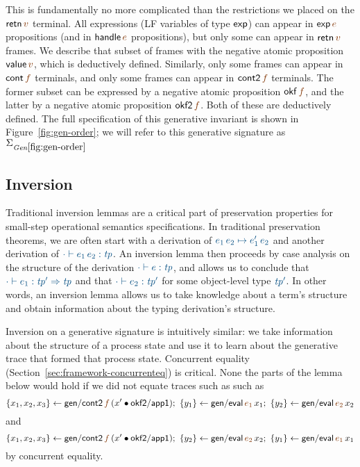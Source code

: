 This is fundamentally no more complicated than the restrictions we
placed on the ${\sf retn}\,\lf{v}$ terminal. All expressions (LF
variables of type ${\sf exp}$) can appear in ${\sf exp}\,\lf{e}$
propositions (and in ${\sf handle}\,\lf{e}$ propositions), but only
some can appear in ${\sf retn}\,\lf{v}$ frames. We describe that
subset of frames with the negative atomic proposition ${\sf
  value}\,\lf{v}$, which is deductively defined. Similarly, only some
frames can appear in ${\sf cont}\,\lf{f}$ terminals, and only some
frames can appear in ${\sf cont2}\,\lf{f}$ terminals. The former subset
can be expressed by a negative atomic proposition ${\sf okf}\,\lf{f}$,
and the latter by a negative atomic proposition ${\sf okf2}\,\lf{f}$.
Both of these are deductively defined.  The full specification of this
generative invariant is shown in Figure~\ref{fig:gen-order}; we will
refer to this generative signature as $\siggenorder$

\subsection{Inversion}\label{sec:inversion-genorder}

Traditional inversion lemmas are a critical part of preservation
properties for small-step operational semantics specifications. In 
traditional preservation theorems, we are often start with a derivation of
$\obj{e_1\,e_2 \mapsto e_1'\,e_2}$ and another derivation of
$\obj{\cdot \vdash e_1\,e_2 : {\it tp}}$. An inversion lemma then proceeds
by case analysis on the structure of the derivation 
$\obj{\cdot \vdash e : {\it tp}}$, and allows us to conclude that
$\obj{\cdot \vdash e_1 : {\it tp'} \Rightarrow {\it tp}}$
and that $\obj{\cdot \vdash e_2 : {\it tp'} }$ for some object-level
type $\obj{\it tp'}$.  In other words, an inversion lemma allows us to 
take knowledge about a term's structure and obtain information about 
the typing derivation's structure. 

Inversion on a generative signature is intuitively similar: we take
information about the structure of a process state and use it to learn
about the generative trace that formed that process state. Concurrent
equality (Section~\ref{sec:framework-concurrenteq}) is critical.
None the parts of the lemma below would hold if we did not
equate traces such as such as
\[
\trstep{x_1, x_2, x_3}{{\sf gen/cont2}\,\lf{f}\,(x' \fuse {\sf okf2/app1})}; ~
\trstep{y_1}{{\sf gen/eval}\,\lf{e_1}\,x_1}; ~
\trstep{y_2}{{\sf gen/eval}\,\lf{e_2}\,x_2}
\]and\[
\trstep{x_1, x_2, x_3}{{\sf gen/cont2}\,\lf{f}\,(x' \fuse {\sf okf2/app1})}; ~
\trstep{y_2}{{\sf gen/eval}\,\lf{e_2}\,x_2}; ~
\trstep{y_1}{{\sf gen/eval}\,\lf{e_1}\,x_1}
\]
by concurrent equality.

